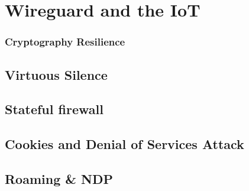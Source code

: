 \chapter{Wireguard and the IoT}
\subsection{Cryptography Resilience}
\section{Virtuous Silence}
\section{Stateful firewall}
\section{Cookies and Denial of Services Attack} \label{iot:cookie}
\section{Roaming \& NDP}